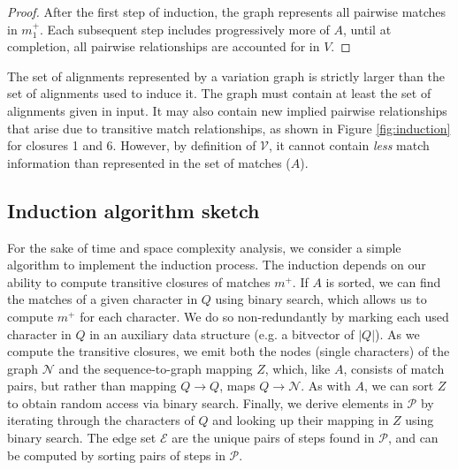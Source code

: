 \documentclass{bioinfo}
\theoremstyle{definition}
\begin{document}
\begin{proof}
After the first step of induction, the graph represents all pairwise matches in $m_1^+$.
Each subsequent step includes progressively more of $A$, until at completion, all pairwise relationships are accounted for in $V$.
\end{proof}

The set of alignments represented by a variation graph is strictly larger than the set of alignments used to induce it.
The graph must contain at least the set of alignments given in input.
It may also contain new implied pairwise relationships that arise due to transitive match relationships, as shown in Figure \ref{fig:induction} for closures 1 and 6.
However, by definition of $\mathcal{V}$, it cannot contain \textit{less} match information than represented in the set of matches ($A$).



\subsection{Induction algorithm sketch}

For the sake of time and space complexity analysis, we consider a simple algorithm to implement the induction process.
The induction depends on our ability to compute transitive closures of matches $m^+$.
If $A$ is sorted, we can find the matches of a given character in $Q$ using binary search, which allows us to compute $m^+$ for each character.
We do so non-redundantly by marking each used character in $Q$ in an auxiliary data structure (e.g. a bitvector of $|Q|$).
As we compute the transitive closures, we emit both the nodes (single characters) of the graph $\mathcal{N}$ and the sequence-to-graph mapping $Z$, which, like $A$, consists of match pairs, but rather than mapping $Q \to Q$, maps $Q \to \mathcal{N}$.
As with $A$, we can sort $Z$ to obtain random access via binary search.
Finally, we derive elements in $\mathcal{P}$ by iterating through the characters of $Q$ and looking up their mapping in $Z$ using binary search.
The edge set $\mathcal{E}$ are the unique pairs of steps found in $\mathcal{P}$, and can be computed by sorting pairs of steps in $\mathcal{P}$.
\end{document}
